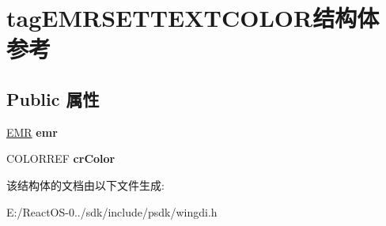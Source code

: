 \hypertarget{structtag_e_m_r_s_e_t_t_e_x_t_c_o_l_o_r}{}\section{tag\+E\+M\+R\+S\+E\+T\+T\+E\+X\+T\+C\+O\+L\+O\+R结构体 参考}
\label{structtag_e_m_r_s_e_t_t_e_x_t_c_o_l_o_r}
\subsection*{Public 属性}
\begin{DoxyCompactItemize}
\item 
\mbox{\label{structtag_e_m_r_s_e_t_t_e_x_t_c_o_l_o_r_a3dbbf742799dde85d7300ce906999fd9}} 
\hyperlink{structtag_e_m_r}{E\+MR} {\bfseries emr}
\item 
\mbox{\label{structtag_e_m_r_s_e_t_t_e_x_t_c_o_l_o_r_ab92ab14f1fcf7592d593c507e2711dbe}} 
C\+O\+L\+O\+R\+R\+EF {\bfseries cr\+Color}
\end{DoxyCompactItemize}


该结构体的文档由以下文件生成\+:\begin{DoxyCompactItemize}
\item 
E\+:/\+React\+O\+S-\/0../sdk/include/psdk/wingdi.\+h\end{DoxyCompactItemize}
